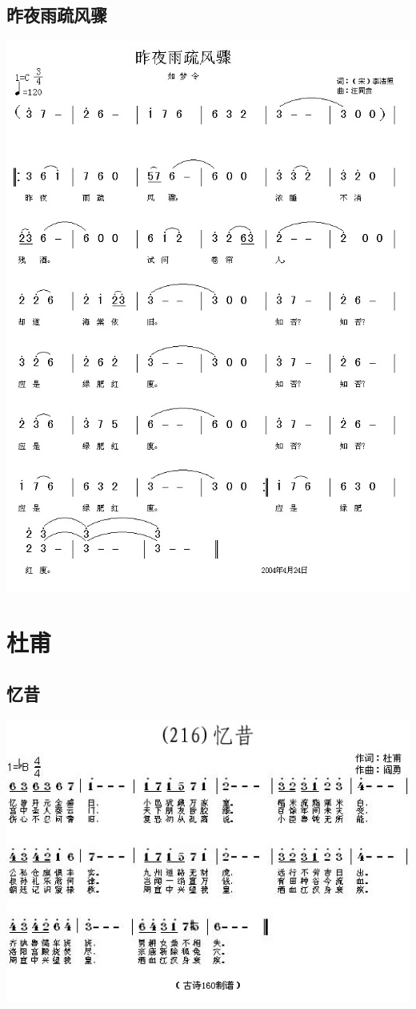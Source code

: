 \documentclass[cn,pad,twocol]{elegantbook}
\begin{document}
\section{昨夜雨疏风骤}
    \includegraphics[width=\textwidth]{dongxiao/20200808-昨夜雨疏风骤-李清照.jpg}    
   
\chapter{杜甫}
\section{忆昔}
    \includegraphics[width=\textwidth]{dongxiao/20200808-忆昔-杜甫.jpg} 
\end{document}
